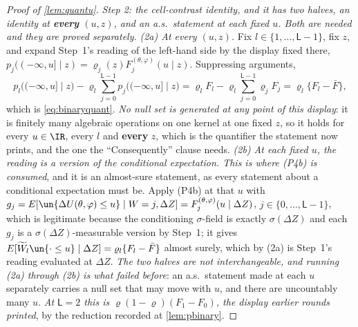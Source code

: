 \begin{proof}[Proof of \cref{lem:quantu}]
\emph{Step 2: the cell-contrast identity, and it has two halves, an identity at \textbf{every}
$(u,z)$, and an a.s.\ statement at each \emph{fixed} $u$. Both are needed and they are proved
separately.}
\emph{(2a) At every $(u,z)$.} Fix $l\in\{1,\dots,\mathsf L-1\}$, fix $z$, and expand Step~1's reading of
the left-hand side by the display fixed there,
$p_j((-\infty,u]\mid z)=\varrho_j(z)F_j^{(\theta,\varphi)}(u\mid z)$. Suppressing arguments,
\[
p_l\big((-\infty,u]\mid z\big)-\varrho_l\sum_{j=0}^{\mathsf L-1}p_j\big((-\infty,u]\mid z\big)
=\varrho_lF_l-\varrho_l\sum_{j=0}^{\mathsf L-1}\varrho_jF_j
=\varrho_l\big\{F_l-\bar F\big\},
\]
which is \eqref{eq:binaryquant}. \emph{No null set is generated at any point of this display}: it is
finitely many algebraic operations on one kernel at one fixed $z$, so it holds for every $u\in\IR$,
every $l$ and \textbf{every} $z$, which is the quantifier the statement now prints, and the one the
``Consequently'' clause needs.
\emph{(2b) At each fixed $u$, the reading is a version of the conditional expectation. This is where
\textup{(P4b)} is consumed}, and it is an almost-sure statement, as every statement about a conditional
expectation must be. Apply (P4b) at that $u$ with
$g_j=E[\un\{\Delta U(\theta,\varphi)\le u\}\mid W=j,\Delta Z]=F_j^{(\theta,\varphi)}(u\mid\Delta Z)$,
$j\in\{0,\dots,\mathsf L-1\}$, which is legitimate because the conditioning $\sigma$-field is exactly
$\sigma(\Delta Z)$ and each $g_j$ is a $\sigma(\Delta Z)$-measurable version by Step~1; it gives
$E[\widetilde W_l\un\{\cdot\le u\}\mid\Delta Z]=\varrho_l\{F_l-\bar F\}$ almost surely, which by (2a) is
Step~1's reading evaluated at $\Delta Z$.
\emph{The two halves are not interchangeable, and running (2a) through (2b) is what failed before}: an
a.s.\ statement made at each $u$ separately carries a null set that may move with $u$, and there are
uncountably many $u$.
\emph{At $\mathsf L=2$
this is $\varrho(1-\varrho)(F_1-F_0)$, the display earlier rounds printed}, by the reduction recorded at
\cref{lem:pbinary}.


\end{proof}
